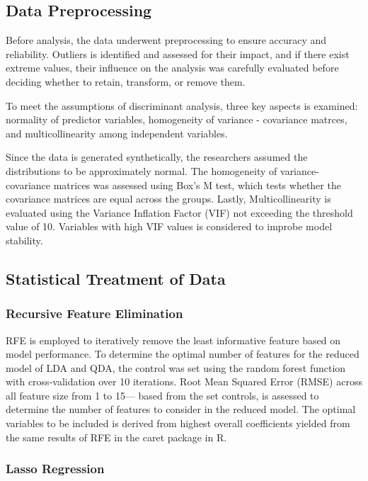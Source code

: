 \documentclass[12pt]{article}
\begin{document}
\subsection{Data Preprocessing}
\noindent

Before analysis, the data underwent preprocessing to ensure accuracy and reliability. Outliers is identified and assessed 
for their impact, and if there exist extreme values, their influence on the analysis was carefully evaluated before deciding whether 
to retain, transform, or remove them. 

To meet the assumptions of discriminant analysis, three key aspects is examined: normality of predictor variables, homogeneity of variance - covariance 
matrces, and multicollinearity among independent variables. 

Since the data is generated synthetically, the researchers assumed the distributions to be approximately normal. The homogeneity of variance-covariance matrices was assessed
using Box's M test, which tests whether the covariance matrices are equal across the groups. Lastly, Multicollinearity is evaluated using the Variance Inflation Factor (VIF) not exceeding
the threshold value of 10. Variables with high VIF values is considered to improbe model stability. 

\subsection{Statistical Treatment of Data}
\subsubsection{Recursive Feature Elimination}
\noindent

RFE is employed to iteratively remove the least informative feature based on model performance. To determine the optimal number of features for the reduced model of LDA and QDA, the control was set using
the random forest function with cross-validation over 10 iterations. Root Mean Squared Error (RMSE) across all feature size from 1 to 15— based from the set controls, is assessed to determine the number of features to consider in the 
reduced model. The optimal variables to be included is derived from highest overall coefficients yielded from the same results of RFE in the caret package in R. 

\subsubsection{Lasso Regression}
\noindent
\end{document}
